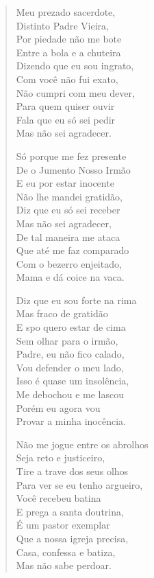 \begin{verse}
Meu prezado sacerdote,\\
Distinto Padre Vieira,\\
Por piedade não me bote\\
Entre a bola e a chuteira\\
Dizendo que eu sou ingrato,\\
Com você não fui exato,\\
Não cumpri com meu dever,\\
Para quem quiser ouvir\\
Fala que eu só sei pedir\\
Mas não sei agradecer.

Só porque me fez presente\\
De o Jumento Nosso Irmão\\
E eu por estar inocente\\
Não lhe mandei gratidão,\\
Diz que eu só sei receber\\
Mas não sei agradecer,\\
De tal maneira me ataca\\
Que até me faz comparado\\
Com o bezerro enjeitado,\\
Mama e dá coice na vaca.

Diz que eu sou forte na rima\\
Mas fraco de gratidão\\
E spo quero estar de cima\\
Sem olhar para o irmão,\\
Padre, eu não fico calado,\\
Vou defender o meu lado,\\
Isso é quase um insolência,\\
Me debochou e me lascou\\
Porém eu agora vou\\
Provar a minha inocência.

Não me jogue entre os abrolhos\\
Seja reto e justiceiro,\\
Tire a trave dos seus olhos\\
Para ver se eu tenho argueiro,\\
Você recebeu batina\\
E prega a santa doutrina,\\
É um pastor exemplar\\
Que a nossa igreja precisa,\\
Casa, confessa e batiza,\\
Mas não sabe perdoar.


\end{verse}
